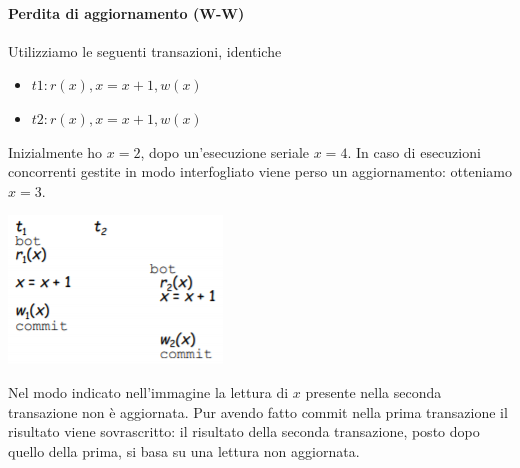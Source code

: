 \paragraph{Perdita di aggiornamento (W-W)} 
Utilizziamo le seguenti transazioni, identiche
\begin{itemize}
	\item $t1: r(x), x = x+1, w(x)$
	\item $t2: r(x), x = x+1, w(x)$
\end{itemize}
Inizialmente ho $x=2$, dopo un'esecuzione seriale $x=4$. In caso di esecuzioni concorrenti gestite in modo interfogliato viene perso un aggiornamento: otteniamo $x=3$.
\begin{center}
	\includegraphics{images/153.PNG}
\end{center}
Nel modo indicato nell'immagine la lettura di $x$ presente nella seconda transazione non è aggiornata. Pur avendo fatto commit nella prima transazione il risultato viene sovrascritto: il risultato della seconda transazione, posto dopo quello della prima, si basa su una lettura non aggiornata.
